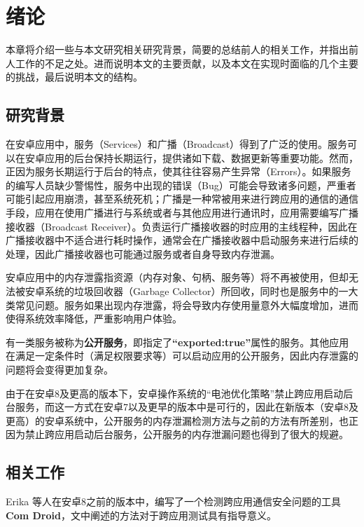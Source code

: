 \chapter{绪论}\label{chapter_introduction}

本章将介绍一些与本文研究相关研究背景，简要的总结前人的相关工作，并指出前人工作的不足之处。进而说明本文的主要贡献，以及本文在实现时面临的几个主要的挑战，最后说明本文的结构。
\section{研究背景}
在安卓应用中，服务（Services）和广播（Broadcast）得到了广泛的使用。服务可以在安卓应用的后台保持长期运行，提供诸如下载、数据更新等重要功能。然而，正因为服务长期运行于后台的特点，使其往往容易产生异常（Errors）。如果服务的编写人员缺少警惕性，服务中出现的错误（Bug）可能会导致诸多问题，严重者可能引起应用崩溃，甚至系统死机；广播是一种常被用来进行跨应用的通信的通信手段，应用在使用广播进行与系统或者与其他应用进行通讯时，应用需要编写广播接收器（Broadcast Receiver）。负责运行广播接收器的时应用的主线程种，因此在广播接收器中不适合进行耗时操作，通常会在广播接收器中启动服务来进行后续的处理，因此广播接收器也可能通过服务或者自身导致内存泄漏。

安卓应用中的内存泄露指资源（内存对象、句柄、服务等）将不再被使用，但却无法被安卓系统的垃圾回收器（Garbage Collector）所回收，同时也是服务中的一大类常见问题。服务如果出现内存泄露，将会导致内存使用量意外大幅度增加，进而使得系统效率降低，严重影响用户体验。

有一类服务被称为\textbf{公开服务}，即指定了\textbf{“exported:true”}属性的服务。其他应用在满足一定条件时（满足权限要求等）可以启动应用的公开服务，因此内存泄露的问题将会变得更加复杂。

由于在安卓8及更高的版本下，安卓操作系统的“电池优化策略”\cite{pms}禁止跨应用启动后台服务\cite{android-service-limit}，而这一方式在安卓7以及更早的版本中是可行的，因此在新版本（安卓8及更高）的安卓系统中，公开服务的内存泄漏检测方法与之前的方法\cite{jun2018lesdroid}有所差别，也正因为禁止跨应用启动后台服务，公开服务的内存泄漏问题也得到了很大的规避。

\section{相关工作}

Erika 等人在安卓8之前的版本中，编写了一个检测跨应用通信安全问题的工具\textbf{Com Droid}\cite{chin2011analyzing}，文中阐述的方法对于跨应用测试具有指导意义。
\newline

